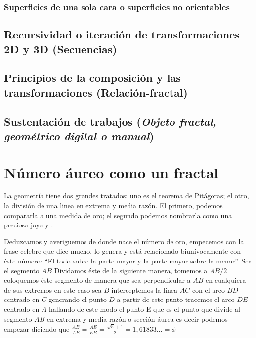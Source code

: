 \documentclass[
  11pt,
]{krantz}
\theoremstyle{definition}
\theoremstyle{definition}
\theoremstyle{definition}
\theoremstyle{definition}
\theoremstyle{remark}
\begin{document}
\hypertarget{superficies-de-una-sola-cara-o-superficies-no-orientables}{%
\subsection{Superficies de una sola cara o superficies no orientables}\label{superficies-de-una-sola-cara-o-superficies-no-orientables}}

\hypertarget{recursividad-o-iteraciuxf3n-de-transformaciones-2d-y-3d-secuencias}{%
\section{Recursividad o iteración de transformaciones 2D y 3D (Secuencias)}\label{recursividad-o-iteraciuxf3n-de-transformaciones-2d-y-3d-secuencias}}

\hypertarget{principios-de-la-composiciuxf3n-y-las-transformaciones-relaciuxf3n-fractal}{%
\section{Principios de la composición y las transformaciones (Relación-fractal)}\label{principios-de-la-composiciuxf3n-y-las-transformaciones-relaciuxf3n-fractal}}

\hypertarget{sustentaciuxf3n-de-trabajos}{%
\section{\texorpdfstring{Sustentación de trabajos (\emph{Objeto fractal, geométrico digital o manual})}{Sustentación de trabajos ()}}\label{sustentaciuxf3n-de-trabajos}}

\hypertarget{nuxfamero-uxe1ureo-como-un-fractal}{%
\chapter{Número áureo como un fractal}\label{nuxfamero-uxe1ureo-como-un-fractal}}

La geometría tiene dos grandes tratados: uno es el teorema de Pitágoras; el otro, la división de una linea en extrema y media razón. El primero, podemos compararla a una medida de oro; el segundo podemos nombrarla como una preciosa joya \citet{Ghy77}
y \citet{ghyka1977geometry}.

Deduzcamos y averiguemos de donde nace el número de oro, empecemos con la frase celebre que dice mucho, lo genera y está relacionado biunívocamente con éste número: ``El todo sobre la parte mayor y la parte mayor sobre la menor''. Sea el segmento \(AB\) Dividamos éste de la siguiente manera,
tomemos a \(AB/2\) coloquemos éste segmento de manera que sea perpendicular
a \(AB\) en cualquiera de sus extremos en este caso sea \(B\) interceptemos la linea
\(AC\) con el arco \(BD\) centrado en \(C\) generando el punto \(D\) a partir de este punto
tracemos el arco \(DE\) centrado en \(A\) hallando de este modo el punto E que es
el punto que divide al segmento \(AB\) en extrema y media razón o sección áurea
es decir podemos empezar diciendo que \(\frac{AB}{AE}=\frac{AE}{EB}=\frac{\sqrt{5}+1}{2}= 1,61833\ldots = \phi\)
\end{document}
